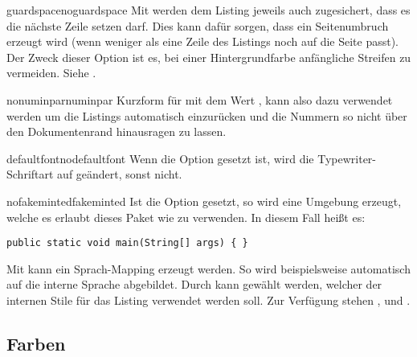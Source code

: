 \documentclass{sopra-base}
\begin{document}
    \begin{argument}{guardspace}{noguardspace}
        Mit  werden dem Listing jeweils auch zugesichert, dass es die nächste Zeile setzen darf. Dies kann dafür sorgen, dass ein Seitenumbruch erzeugt wird (wenn weniger als eine Zeile des Listings noch auf die Seite passt). Der Zweck dieser Option ist es, bei einer Hintergrundfarbe anfängliche Streifen zu vermeiden. Siehe .
    \end{argument}

    \begin{argument}{nonuminpar}{numinpar}
        Kurzform für  mit dem Wert \glqq{}{\makeatletter\@@sol@numinpar@length}\grqq{}, kann also dazu verwendet
        werden um die Listings automatisch einzurücken und die Nummern so nicht über den Dokumentenrand hinausragen zu lassen.
    \end{argument}

    \begin{argument}{defaultfont}{nodefaultfont}
        Wenn die Option gesetzt ist, wird die Typewriter-Schriftart auf  geändert, sonst nicht.
    \end{argument}


    \begin{argument}{nofakeminted}{fakeminted}
        Ist die Option gesetzt, so wird eine  Umgebung erzeugt, welche es erlaubt dieses Paket wie  zu verwenden. In diesem Fall heißt es:
\begin{plainlatex}
\begin{verbatim}
public static void main(String[] args) { }
\end{verbatim}
\end{plainlatex}
        Mit  kann ein Sprach-Mapping erzeugt werden. So wird beispielsweise automatisch  auf die interne Sprache  abgebildet.
        Durch  kann gewählt werden, welcher der internen Stile für das Listing verwendet werden soll. Zur Verfügung stehen ,  und .
    \end{argument}

\subsection{Farben}
\end{document}
